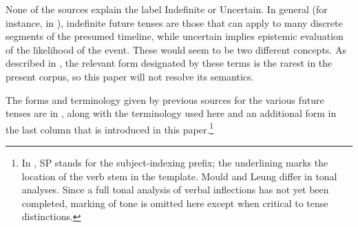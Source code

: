 \documentclass[output=paper]{langsci/langscibook}
\begin{document}
None of the sources explain the label Indefinite or Uncertain. In general (for instance, in \citealt[20]{Johnson1977}), indefinite %
%
%
%
%
future tenses are those that can apply to many discrete segments of the presumed timeline, while uncertain implies epistemic evaluation of the likelihood of the event. These would seem to be two different concepts. As described in , the relevant form designated by these terms is the rarest in the present corpus, so this paper will not resolve its semantics.

The forms and terminology given by previous sources for the various  future tenses are in , along with the terminology used here and an additional form in the last column that is introduced in this paper.\footnote{In , SP stands for the subject-indexing prefix; the underlining marks the location of the verb stem in the template. Mould and Leung differ in tonal analyses. Since a full tonal analysis of  verbal inflections has not yet been completed, marking of tone is omitted here except when critical to tense distinctions.}  
\end{document}
